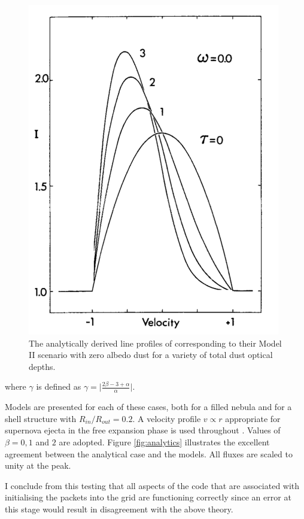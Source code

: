 \begin{figure}
\centering
\includegraphics[trim =0 0 0 0,clip=true,scale=0.6]{chapters/chapter4/images/Lucy89_Model2.png}
\caption{The analytically derived line profiles of \citep{Lucy1989} corresponding to their Model II scenario with zero albedo dust for a variety of total dust optical depths.}
\label{fig:LucyMod2}
\end{figure}

\noindent where $\gamma$ is defined as $\gamma= \lvert 
\frac{2\beta-3+\alpha}{\alpha} \rvert$.

Models are presented for each of these cases, both for a filled nebula and for a shell structure with $R_{in}/R_{out}=0.2$.  A velocity profile $v \propto r$ appropriate for supernova ejecta in the free expansion phase is used throughout \citep{Li1992,Xu1992,McCray1996,Baron2005}.  Values of 
$\beta = 0, 1$ and $2$ are adopted.  Figure \ref{fig:analytics} 
illustrates the excellent agreement between the analytical case and the 
models.  All fluxes are scaled to unity at the peak.

I conclude from this testing that all aspects of the code that are associated with initialising the packets into the grid are functioning correctly since an error at this stage would result in disagreement with the above theory.  


